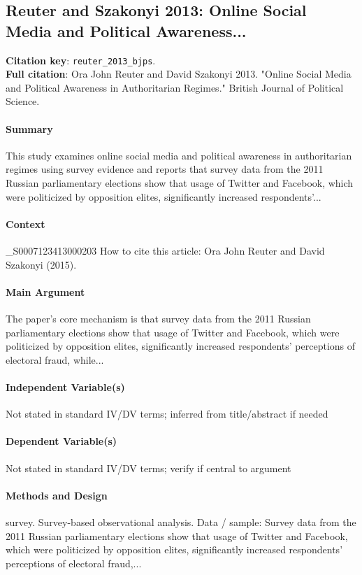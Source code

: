 \documentclass[12pt]{article}
\begin{document}
\subsection{Reuter and Szakonyi 2013: Online Social Media and Political Awareness...}
\textbf{Citation key}: \texttt{reuter\_2013\_bjps}.\\
\textbf{Full citation}: Ora John Reuter and David Szakonyi 2013. "Online Social Media and Political Awareness in Authoritarian Regimes." British Journal of Political Science.

\paragraph{Summary} This study examines online social media and political awareness in authoritarian regimes using survey evidence and reports that survey data from the 2011 Russian parliamentary elections show that usage of Twitter and Facebook, which were politicized by opposition elites, significantly increased respondents'...

\paragraph{Context} \_S0007123413000203 How to cite this article: Ora John Reuter and David Szakonyi (2015).

\paragraph{Main Argument} The paper's core mechanism is that survey data from the 2011 Russian parliamentary elections show that usage of Twitter and Facebook, which were politicized by opposition elites, significantly increased respondents' perceptions of electoral fraud, while...

\paragraph{Independent Variable(s)} Not stated in standard IV/DV terms; inferred from title/abstract if needed

\paragraph{Dependent Variable(s)} Not stated in standard IV/DV terms; verify if central to argument

\paragraph{Methods and Design} survey. Survey-based observational analysis. Data / sample: Survey data from the 2011 Russian parliamentary elections show that usage of Twitter and Facebook, which were politicized by opposition elites, significantly increased respondents' perceptions of electoral fraud,...
\end{document}
